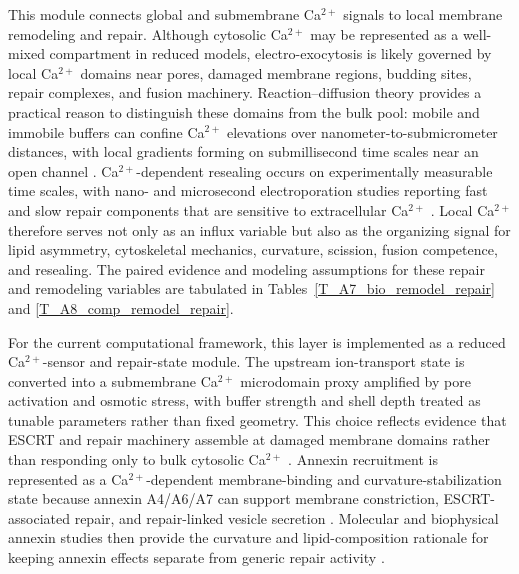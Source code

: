 This module connects global and submembrane Ca$^{2+}$ signals to local membrane remodeling and repair. Although cytosolic Ca$^{2+}$ may be represented as a well-mixed compartment in reduced models, electro-exocytosis is likely governed by local Ca$^{2+}$ domains near pores, damaged membrane regions, budding sites, repair complexes, and fusion machinery. Reaction--diffusion theory provides a practical reason to distinguish these domains from the bulk pool: mobile and immobile buffers can confine Ca$^{2+}$ elevations over nanometer-to-submicrometer distances, with local gradients forming on submillisecond time scales near an open channel \cite{naraghi1997linearized}. Ca$^{2+}$-dependent resealing occurs on experimentally measurable time scales, with nano- and microsecond electroporation studies reporting fast and slow repair components that are sensitive to extracellular Ca$^{2+}$ \cite{bhattacharya2022calcium}. Local Ca$^{2+}$ therefore serves not only as an influx variable but also as the organizing signal for lipid asymmetry, cytoskeletal mechanics, curvature, scission, fusion competence, and resealing. The paired evidence and modeling assumptions for these repair and remodeling variables are tabulated in Tables~\ref{T_A7_bio_remodel_repair} and \ref{T_A8_comp_remodel_repair}.

For the current computational framework, this layer is implemented as a reduced Ca$^{2+}$-sensor and repair-state module. The upstream ion-transport state is converted into a submembrane Ca$^{2+}$ microdomain proxy amplified by pore activation and osmotic stress, with buffer strength and shell depth treated as tunable parameters rather than fixed geometry. This choice reflects evidence that ESCRT and repair machinery assemble at damaged membrane domains rather than responding only to bulk cytosolic Ca$^{2+}$ \cite{scheffer2014mechanism,shukla2022vitro}. Annexin recruitment is represented as a Ca$^{2+}$-dependent membrane-binding and curvature-stabilization state because annexin A4/A6/A7 can support membrane constriction, ESCRT-associated repair, and repair-linked vesicle secretion \cite{boye2017annexin,sonder2019annexin,muratori2021role,williams2023annexin}. Molecular and biophysical annexin studies then provide the curvature and lipid-composition rationale for keeping annexin effects separate from generic repair activity \cite{mularski2022interplay,hakamiZanjani2024modulation}.


